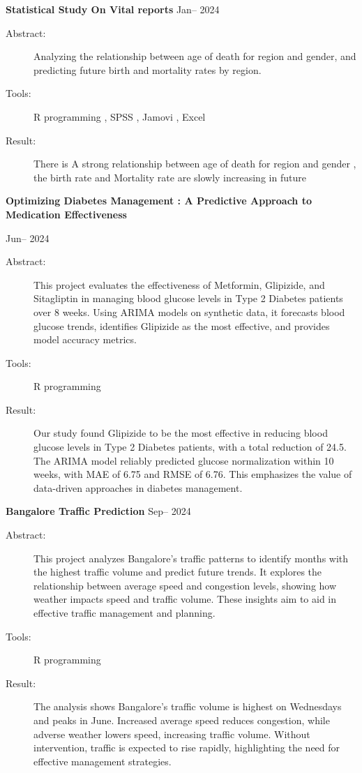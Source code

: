 \documentclass[a4paper,11pt]{article}
\begin{document}
	\noindent
	{\textbf{Statistical Study On Vital reports} \hfill Jan-- 2024 \\}
	\begin{description}
		\item[Abstract:] Analyzing the relationship between age of death for region and gender, and predicting future birth and mortality rates by region.
		\item[Tools:] R programming , SPSS , Jamovi , Excel
		\item[Result:] There is A strong relationship between age of death for region and gender , the birth rate and Mortality rate are slowly increasing in future\\
		\linebreak[2mm]
	\end{description}
	\textbf{Optimizing Diabetes Management : A Predictive Approach to Medication Effectiveness}
	\begin{flushright}
		\hfill Jun-- 2024 \\
	\end{flushright}
	\begin{description}
		\item[Abstract:] This project evaluates the effectiveness of Metformin, Glipizide, and Sitagliptin in managing blood glucose levels in Type 2 Diabetes patients over 8 weeks. Using ARIMA models on synthetic data, it forecasts blood glucose trends, identifies Glipizide as the most effective, and provides model accuracy metrics.
		\item[Tools:] R programming 
		\item[Result:] Our study found Glipizide to be the most effective in reducing blood glucose levels in Type 2 Diabetes patients, with a total reduction of 24.5. The ARIMA model reliably predicted glucose normalization within 10 weeks, with MAE of 6.75 and RMSE of 6.76. This emphasizes the value of data-driven approaches in diabetes management.
		
		
	\end{description}
	\vspace{12pt}
	{\textbf{Bangalore Traffic Prediction} \hfill Sep-- 2024 \\}
	\begin{description}
		\item[Abstract:] This project analyzes Bangalore’s traffic patterns to identify months with the highest traffic volume and predict future trends. It explores the relationship between average speed and congestion levels, showing how weather impacts speed and traffic volume. These insights aim to aid in effective traffic management and planning.
		\item[Tools:] R programming 
		\item[Result:] The analysis shows Bangalore’s traffic volume is highest on Wednesdays and peaks in June. Increased average speed reduces congestion, while adverse weather lowers speed, increasing traffic volume. Without intervention, traffic is expected to rise rapidly, highlighting the need for effective management strategies.
		
		
	\end{description}
\end{document}
